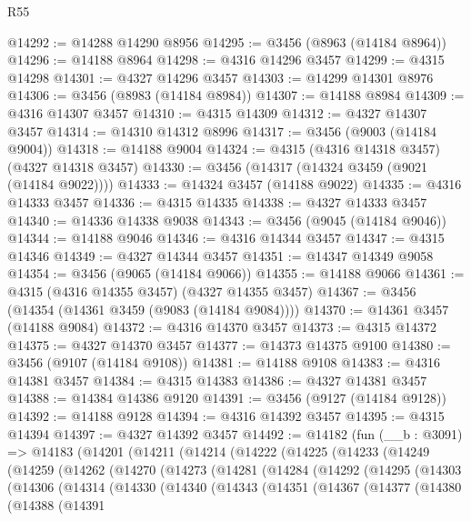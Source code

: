 \begin{lexlean}{R55}
\begin{coremodule}
@14292 := @14288 @14290 @8956
@14295 := @3456 (@8963 (@14184 @8964))
@14296 := @14188 @8964
@14298 := @4316 @14296 @3457
@14299 := @4315 @14298
@14301 := @4327 @14296 @3457
@14303 := @14299 @14301 @8976
@14306 := @3456 (@8983 (@14184 @8984))
@14307 := @14188 @8984
@14309 := @4316 @14307 @3457
@14310 := @4315 @14309
@14312 := @4327 @14307 @3457
@14314 := @14310 @14312 @8996
@14317 := @3456 (@9003 (@14184 @9004))
@14318 := @14188 @9004
@14324 := @4315 (@4316 @14318 @3457) (@4327 @14318 @3457)
@14330 := @3456 (@14317 (@14324 @3459 (@9021 (@14184 @9022))))
@14333 := @14324 @3457 (@14188 @9022)
@14335 := @4316 @14333 @3457
@14336 := @4315 @14335
@14338 := @4327 @14333 @3457
@14340 := @14336 @14338 @9038
@14343 := @3456 (@9045 (@14184 @9046))
@14344 := @14188 @9046
@14346 := @4316 @14344 @3457
@14347 := @4315 @14346
@14349 := @4327 @14344 @3457
@14351 := @14347 @14349 @9058
@14354 := @3456 (@9065 (@14184 @9066))
@14355 := @14188 @9066
@14361 := @4315 (@4316 @14355 @3457) (@4327 @14355 @3457)
@14367 := @3456 (@14354 (@14361 @3459 (@9083 (@14184 @9084))))
@14370 := @14361 @3457 (@14188 @9084)
@14372 := @4316 @14370 @3457
@14373 := @4315 @14372
@14375 := @4327 @14370 @3457
@14377 := @14373 @14375 @9100
@14380 := @3456 (@9107 (@14184 @9108))
@14381 := @14188 @9108
@14383 := @4316 @14381 @3457
@14384 := @4315 @14383
@14386 := @4327 @14381 @3457
@14388 := @14384 @14386 @9120
@14391 := @3456 (@9127 (@14184 @9128))
@14392 := @14188 @9128
@14394 := @4316 @14392 @3457
@14395 := @4315 @14394
@14397 := @4327 @14392 @3457
@14492 := @14182
    (fun (__b : @3091) =>
    @14183
      (@14201
        (@14211
          (@14214
            (@14222
              (@14225
                (@14233
                  (@14249
                    (@14259
                      (@14262
                        (@14270
                          (@14273
                            (@14281
                              (@14284
                                (@14292
                                  (@14295
                                    (@14303
                                      (@14306
                                        (@14314
                                          (@14330
                                            (@14340
                                              (@14343
                                                (@14351
                                                  (@14367
                                                    (@14377
                                                      (@14380
                                                        (@14388
                                                          (@14391

\end{coremodule}
\end{lexlean}

